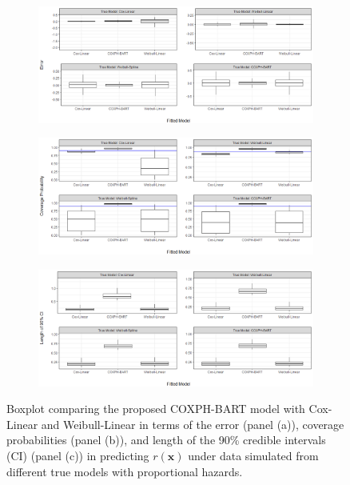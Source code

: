 \documentclass[12pt]{article}
\begin{document}
\begin{figure}
\centering
\begin{subfigure}[t]{0.85\textwidth}
\centering
\includegraphics[width=\textwidth]{PH_Boxplot_Error.png} 
\caption{} \label{fig:timing1}
\end{subfigure}

\begin{subfigure}[t]{0.85\textwidth}
\centering
\includegraphics[width=\textwidth]{PH_Boxplot_CP.png} 
\caption{} \label{fig:timing2}
\end{subfigure}


\begin{subfigure}[t]{0.85\textwidth}
\centering
\includegraphics[width=\textwidth]{PH_Boxplot_Length.png} 
\caption{} \label{fig:timing3}
 \end{subfigure}

 \caption{Boxplot comparing the proposed COXPH-BART model with Cox-Linear and Weibull-Linear in terms of the error (panel (a)),  coverage probabilities (panel (b)), and length of the 90\% credible intervals (CI) (panel (c)) in predicting $r(\mathbf{x})$ under data simulated from different true models with proportional hazards.}
\label{fig:combined_boxplot_ph}
\end{figure}
\end{document}
